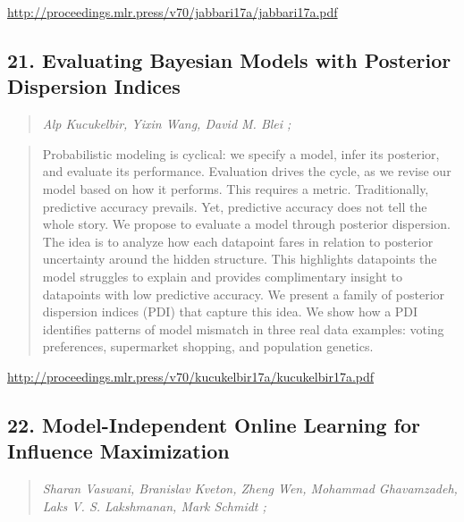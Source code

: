 \documentclass{article}
\begin{document}
\href{http://proceedings.mlr.press/v70/jabbari17a/jabbari17a.pdf}{http://proceedings.mlr.press/v70/jabbari17a/jabbari17a.pdf}

\subsection{21. Evaluating Bayesian Models with Posterior Dispersion Indices}

\begin{quote}
\footnotesize{\textit{Alp Kucukelbir, Yixin Wang, David M. Blei ;}}
\end{quote}

\begin{quote}
    Probabilistic modeling is cyclical: we specify a model, infer its posterior, and evaluate its performance. Evaluation drives the cycle, as we revise our model based on how it performs. This requires a metric. Traditionally, predictive accuracy prevails. Yet, predictive accuracy does not tell the whole story. We propose to evaluate a model through posterior dispersion. The idea is to analyze how each datapoint fares in relation to posterior uncertainty around the hidden structure. This highlights datapoints the model struggles to explain and provides complimentary insight to datapoints with low predictive accuracy. We present a family of posterior dispersion indices (PDI) that capture this idea. We show how a PDI identifies patterns of model mismatch in three real data examples: voting preferences, supermarket shopping, and population genetics.  \end{quote}

\href{http://proceedings.mlr.press/v70/kucukelbir17a/kucukelbir17a.pdf}{http://proceedings.mlr.press/v70/kucukelbir17a/kucukelbir17a.pdf}

\subsection{22. Model-Independent Online Learning for Influence Maximization}

\begin{quote}
\footnotesize{\textit{Sharan Vaswani, Branislav Kveton, Zheng Wen, Mohammad Ghavamzadeh, Laks V. S. Lakshmanan, Mark Schmidt ;}}
\end{quote}
\end{document}
